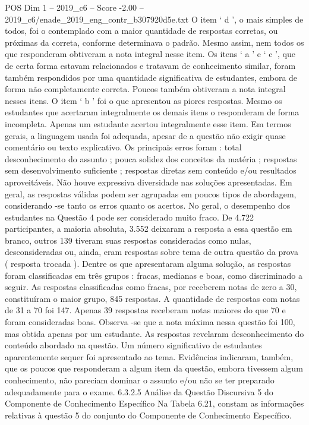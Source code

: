 \begin{textsample}{POS Dim 1 – 2019\_c6 – Score -2.00 – 2019\_c6/enade\_2019\_eng\_contr\_b307920d5e.txt}
O item ‘ d ’, o mais simples de todos, foi o contemplado com a maior quantidade de respostas corretas, ou próximas da correta, conforme determinava o padrão.
Mesmo assim, nem todos os que responderam obtiveram a nota integral nesse item.
Os itens ‘ a ’ e ‘ c ’, que de certa forma estavam relacionados e tratavam de conhecimento similar, foram também respondidos por uma quantidade significativa de estudantes, embora de forma não completamente correta.
Poucos também obtiveram a nota integral nesses itens.
O item ‘ b ’ foi o que apresentou as piores respostas.
Mesmo os estudantes que acertaram integralmente os demais itens o responderam de forma incompleta.
Apenas um estudante acertou integralmente esse item.
Em termos gerais, a linguagem usada foi adequada, apesar de a questão não exigir quase comentário ou texto explicativo.
Os principais erros foram : total desconhecimento do assunto ; pouca solidez dos conceitos da matéria ; respostas sem desenvolvimento suficiente ; respostas diretas sem conteúdo e/ou resultados aproveitáveis.
Não houve expressiva diversidade nas soluções apresentadas.
Em geral, as respostas válidas podem ser agrupadas em poucos tipos de abordagem, considerando -se tanto os erros quanto os acertos.
No geral, o desempenho dos estudantes na Questão 4 pode ser considerado muito fraco.
De 4.722 participantes, a maioria absoluta, 3.552 deixaram a resposta a essa questão em branco, outros 139 tiveram suas respostas consideradas como nulas, desconsideradas ou, ainda, eram respostas sobre tema de outra questão da prova ( resposta trocada ).
Dentre os que apresentaram alguma solução, as respostas foram classificadas em três grupos : fracas, medianas e boas, como discriminado a seguir.
As respostas classificadas como fracas, por receberem notas de zero a 30, constituíram o maior grupo, 845 respostas.
A quantidade de respostas com notas de 31 a 70 foi 147.
Apenas 39 respostas receberam notas maiores do que 70 e foram consideradas boas.
Observa -se que a nota máxima nessa questão foi 100, mas obtida apenas por um estudante.
As respostas revelaram desconhecimento do conteúdo abordado na questão.
Um número significativo de estudantes aparentemente sequer foi apresentado ao tema.
Evidências indicaram, também, que os poucos que responderam a algum item da questão, embora tivessem algum conhecimento, não pareciam dominar o assunto e/ou não se ter preparado adequadamente para o exame. 6.3.2.5 Análise da Questão Discursiva 5 do Componente de Conhecimento Específico Na Tabela 6.21, constam as informações relativas à questão 5 do conjunto do Componente de Conhecimento Específico.

\end{textsample}
